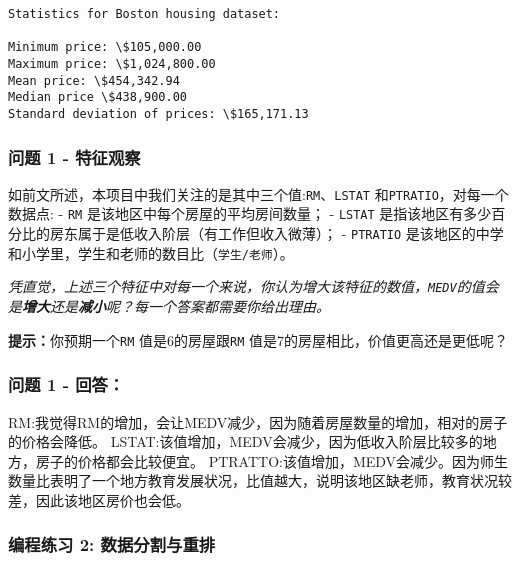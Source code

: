 \documentclass[11pt]{article}
\begin{document}
    \begin{Verbatim}[commandchars=\\\{\}]
Statistics for Boston housing dataset:

Minimum price: \$105,000.00
Maximum price: \$1,024,800.00
Mean price: \$454,342.94
Median price \$438,900.00
Standard deviation of prices: \$165,171.13

    \end{Verbatim}

    \subsubsection{问题 1 -
特征观察}\label{ux95eeux9898-1---ux7279ux5f81ux89c2ux5bdf}

如前文所述，本项目中我们关注的是其中三个值:\texttt{\textquotesingle{}RM\textquotesingle{}}、\texttt{\textquotesingle{}LSTAT\textquotesingle{}}
和\texttt{\textquotesingle{}PTRATIO\textquotesingle{}}，对每一个数据点:
- \texttt{\textquotesingle{}RM\textquotesingle{}}
是该地区中每个房屋的平均房间数量； -
\texttt{\textquotesingle{}LSTAT\textquotesingle{}}
是指该地区有多少百分比的房东属于是低收入阶层（有工作但收入微薄）； -
\texttt{\textquotesingle{}PTRATIO\textquotesingle{}}
是该地区的中学和小学里，学生和老师的数目比（\texttt{学生/老师}）。

\emph{凭直觉，上述三个特征中对每一个来说，你认为增大该特征的数值，\texttt{\textquotesingle{}MEDV\textquotesingle{}}的值会是\textbf{增大}还是\textbf{减小}呢？每一个答案都需要你给出理由。}

\textbf{提示：}你预期一个\texttt{\textquotesingle{}RM\textquotesingle{}}
值是6的房屋跟\texttt{\textquotesingle{}RM\textquotesingle{}}
值是7的房屋相比，价值更高还是更低呢？

    \subsubsection{问题 1 - 回答：}\label{ux95eeux9898-1---ux56deux7b54}

RM:我觉得RM的增加，会让MEDV减少，因为随着房屋数量的增加，相对的房子的价格会降低。
LSTAT:该值增加，MEDV会减少，因为低收入阶层比较多的地方，房子的价格都会比较便宜。
PTRATTO:该值增加，MEDV会减少。因为师生数量比表明了一个地方教育发展状况，比值越大，说明该地区缺老师，教育状况较差，因此该地区房价也会低。

    \subsubsection{编程练习 2:
数据分割与重排}\label{ux7f16ux7a0bux7ec3ux4e60-2-ux6570ux636eux5206ux5272ux4e0eux91cdux6392}
\end{document}
